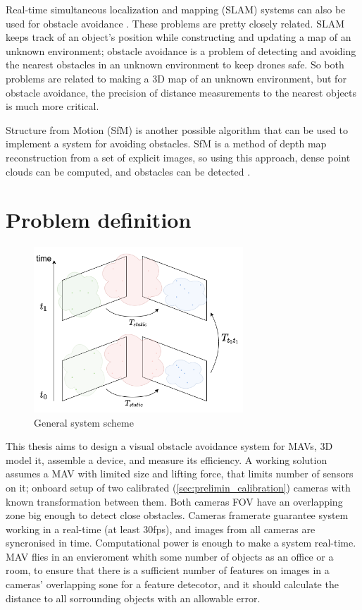 Real-time simultaneous localization and mapping (SLAM) systems can also be used for obstacle avoidance \cite{Moreno2014}. 
These problems are pretty closely related. 
SLAM keeps track of an object's position while constructing and updating a map of an unknown environment; obstacle avoidance is a problem of detecting and avoiding the nearest obstacles in an unknown environment to keep drones safe.
So both problems are related to making a 3D map of an unknown environment, but for obstacle avoidance, the precision of distance measurements to the nearest objects is much more critical.

Structure from Motion (SfM) is another possible algorithm that can be used to implement a system for avoiding obstacles. 
SfM is a method of depth map reconstruction from a set of explicit images, so using this approach, dense point clouds can be computed, and obstacles can be detected \cite{Lee2008}. 

\section{Problem definition}
\begin{figure}[t]
    \centering
    \includegraphics[width=0.7\textwidth]{graphics/general_scheme.png}
    \caption{General system scheme}
    \label{fig:intro_general}
\end{figure}

This thesis aims to design a visual obstacle avoidance system for MAVs, 3D model it, assemble a device, and measure its efficiency. 
A working solution assumes a MAV with limited size and lifting force, that limits number of sensors on it; onboard setup of two calibrated (\autoref{sec:prelimin_calibration}) cameras with known transformation between them.
Both cameras FOV have an overlapping zone big enough to detect close obstacles.
Cameras framerate guarantee system working in a real-time (at least 30fps), and images from all cameras are syncronised in time.
Computational power is enough to make a system real-time.
MAV flies in an envieroment whith some number of objects as an office or a room, to ensure that there is a sufficient number of features on images in a cameras' overlapping sone for a feature detecotor, and it should calculate the distance to all sorrounding objects with an allowable error.

